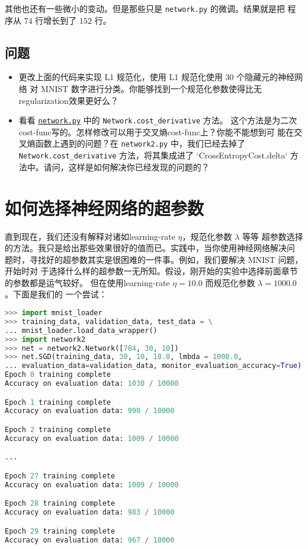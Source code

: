 其他也还有一些微小的变动。但是那些只是 \lstinline!network.py! 的微调。结果就是把
程序从 $74$ 行增长到了 $152$ 行。

\subsection*{问题}

\begin{itemize}
\item 更改上面的代码来实现 L1 规范化，使用 L1 规范化使用 $30$ 个隐藏元的神经网络
  对 MNIST 数字进行分类。你能够找到一个规范化参数使得比无\gls*{regularization}效果更好么？
\item 看看 \href{https://github.com/mnielsen/neural-networks-and-deep-learning/blob/master/src/network.py}{\lstinline!network.py!} 中的 \lstinline!Network.cost_derivative! 方法。
  这个方法是为二次\gls*{cost-func}写的。怎样修改可以用于交叉熵\gls*{cost-func}上？你能不能想到可
  能在交叉熵函数上遇到的问题？在 \lstinline!network2.py! 中，我们已经去掉了
  \lstinline!Network.cost_derivative! 方法，将其集成进了
  `CrossEntropyCost.delta` 方法中。请问，这样是如何解决你已经发现的问题的？
\end{itemize}

\section{如何选择神经网络的超参数}
\label{sec:how_to_choose_a_neural_network's_hyper-parameters}

直到现在，我们还没有解释对诸如\gls*{learning-rate} $\eta$，规范化参数 $\lambda$ 等等
超参数选择的方法。我只是给出那些效果很好的值而已。实践中，当你使用神经网络解决问
题时，寻找好的超参数其实是很困难的一件事。例如，我们要解决 MNIST 问题，开始时对
于选择什么样的超参数一无所知。假设，刚开始的实验中选择前面章节的参数都是运气较好。
但在使用\gls*{learning-rate} $\eta=10.0$ 而规范化参数 $\lambda=1000.0$。下面是我们的
一个尝试：

\begin{lstlisting}[language=Python]
>>> import mnist_loader
>>> training_data, validation_data, test_data = \
... mnist_loader.load_data_wrapper()
>>> import network2
>>> net = network2.Network([784, 30, 10])
>>> net.SGD(training_data, 30, 10, 10.0, lmbda = 1000.0,
... evaluation_data=validation_data, monitor_evaluation_accuracy=True)
Epoch 0 training complete
Accuracy on evaluation data: 1030 / 10000

Epoch 1 training complete
Accuracy on evaluation data: 990 / 10000

Epoch 2 training complete
Accuracy on evaluation data: 1009 / 10000

...

Epoch 27 training complete
Accuracy on evaluation data: 1009 / 10000

Epoch 28 training complete
Accuracy on evaluation data: 983 / 10000

Epoch 29 training complete
Accuracy on evaluation data: 967 / 10000
\end{lstlisting}

